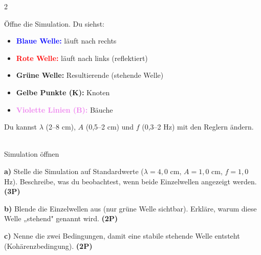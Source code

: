 \documentclass[11pt,a4paper]{article}
\begin{document}
\begin{multicols}{2}
\setlength{\columnseprule}{0.4pt}

\begin{tcolorbox}[colback=blue!5,colframe=blue!40!black,coltitle=black,colbacktitle=blue!10,
    title=\textbf{Simulation: Stehende Wellen}]
\small
Öffne die Simulation. Du siehst:
\begin{itemize}[leftmargin=*]
\item \textcolor{blue}{\textbf{Blaue Welle:}} läuft nach rechts
\item \textcolor{red}{\textbf{Rote Welle:}} läuft nach links (reflektiert)
\item \textcolor{green!50!black}{\textbf{Grüne Welle:}} Resultierende (stehende Welle)
\item \textcolor{yellow!80!black}{\textbf{Gelbe Punkte (K):}} Knoten
\item \textcolor{violet}{\textbf{Violette Linien (B):}} Bäuche
\end{itemize}

Du kannst $\lambda$ (2--8 cm), $A$ (0,5--2 cm) und $f$ (0,3--2 Hz) mit den Reglern ändern.

\vspace{0.2cm}
\begin{center}
\\[0.2cm]
\tiny Simulation öffnen
\end{center}
\end{tcolorbox}

\vspace{0.3cm}

\begin{tcolorbox}[colback=white,colframe=black,coltitle=black,colbacktitle=white,
    title=\textbf{1: Beobachtung der Superposition}]

\textbf{a)} Stelle die Simulation auf Standardwerte ($\lambda = 4{,}0$ cm, $A = 1{,}0$ cm, $f = 1{,}0$ Hz). Beschreibe, was du beobachtest, wenn beide Einzelwellen angezeigt werden. \textbf{(3P)}

\vspace{2.5cm}

\textbf{b)} Blende die Einzelwellen aus (nur grüne Welle sichtbar). Erkläre, warum diese Welle „stehend" genannt wird. \textbf{(2P)}

\vspace{2cm}

\textbf{c)} Nenne die zwei Bedingungen, damit eine stabile stehende Welle entsteht (Kohärenzbedingung). \textbf{(2P)}


\end{tcolorbox}
\end{multicols}
\end{document}
